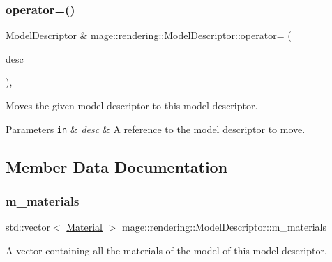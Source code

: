 \subsubsection{\texorpdfstring{operator=()}{operator=()}\hspace{0.1cm}{\footnotesize\ttfamily [2/2]}}
{\footnotesize\ttfamily \mbox{\hyperlink{classmage_1_1rendering_1_1_model_descriptor}{Model\+Descriptor}} \& mage\+::rendering\+::\+Model\+Descriptor\+::operator= (\begin{DoxyParamCaption}\item[{\mbox{\hyperlink{classmage_1_1rendering_1_1_model_descriptor}{Model\+Descriptor}} \&\&}]{desc }\end{DoxyParamCaption})\hspace{0.3cm}{\ttfamily [default]}, {\ttfamily [noexcept]}}

Moves the given model descriptor to this model descriptor.


\begin{DoxyParams}[1]{Parameters}
\mbox{\tt in}  & {\em desc} & A reference to the model descriptor to move. \\
\hline
\end{DoxyParams}


\subsection{Member Data Documentation}
\mbox{\label{classmage_1_1rendering_1_1_model_descriptor_ae88269763478f47e5d6c0086a4aeb33b}} 
\subsubsection{\texorpdfstring{m\+\_\+materials}{m\_materials}}
{\footnotesize\ttfamily std\+::vector$<$ \mbox{\hyperlink{classmage_1_1rendering_1_1_material}{Material}} $>$ mage\+::rendering\+::\+Model\+Descriptor\+::m\+\_\+materials\hspace{0.3cm}{\ttfamily [private]}}

A vector containing all the materials of the model of this model descriptor. \mbox{\label{classmage_1_1rendering_1_1_model_descriptor_a18fd5970f038726fd200e60f3c5ad33e}} 
